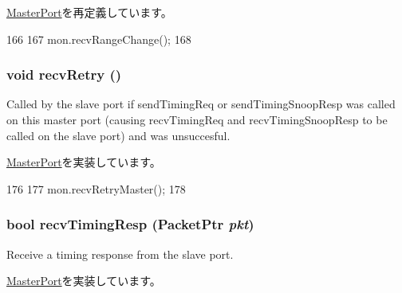 \hyperlink{classMasterPort_af60d9c2c17fb4c9ebc5384a7e0c9f289}{MasterPort}を再定義しています。


\begin{DoxyCode}
166         {
167             mon.recvRangeChange();
168         }
\end{DoxyCode}
\hypertarget{classCommMonitor_1_1MonitorMasterPort_a29cb5a4f98063ce6e9210eacbdb35298}{
\subsubsection[{recvRetry}]{\setlength{\rightskip}{0pt plus 5cm}void recvRetry ()}}
\label{classCommMonitor_1_1MonitorMasterPort_a29cb5a4f98063ce6e9210eacbdb35298}
Called by the slave port if sendTimingReq or sendTimingSnoopResp was called on this master port (causing recvTimingReq and recvTimingSnoopResp to be called on the slave port) and was unsuccesful. 

\hyperlink{classMasterPort_ac1ccc3bcf7ebabb20b57fab99b2be5b0}{MasterPort}を実装しています。


\begin{DoxyCode}
176         {
177             mon.recvRetryMaster();
178         }
\end{DoxyCode}
\hypertarget{classCommMonitor_1_1MonitorMasterPort_a482dba5588f4bee43e498875a61e5e0b}{
\subsubsection[{recvTimingResp}]{\setlength{\rightskip}{0pt plus 5cm}bool recvTimingResp ({\bf PacketPtr} {\em pkt})}}
\label{classCommMonitor_1_1MonitorMasterPort_a482dba5588f4bee43e498875a61e5e0b}
Receive a timing response from the slave port. 

\hyperlink{classMasterPort_abd323548d6c93f8b0543f1fe3a86ca35}{MasterPort}を実装しています。


